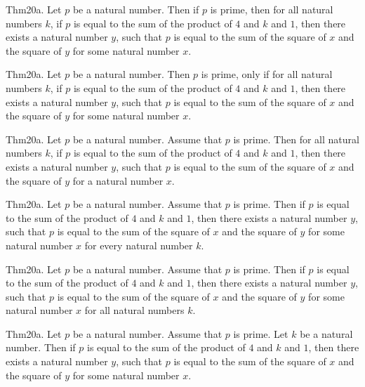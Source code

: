 \documentclass{article}
\begin{document}
Thm20a. Let $p$ be a natural number. Then if $p$ is prime, then for all natural numbers $k$, if $p$ is equal to the sum of the product of $4$ and $k$ and $1$, then there exists a natural number $y$, such that $p$ is equal to the sum of the square of $x$ and the square of $y$ for some natural number $x$.

Thm20a. Let $p$ be a natural number. Then $p$ is prime, only if for all natural numbers $k$, if $p$ is equal to the sum of the product of $4$ and $k$ and $1$, then there exists a natural number $y$, such that $p$ is equal to the sum of the square of $x$ and the square of $y$ for some natural number $x$.

Thm20a. Let $p$ be a natural number. Assume that $p$ is prime. Then for all natural numbers $k$, if $p$ is equal to the sum of the product of $4$ and $k$ and $1$, then there exists a natural number $y$, such that $p$ is equal to the sum of the square of $x$ and the square of $y$ for a natural number $x$.

Thm20a. Let $p$ be a natural number. Assume that $p$ is prime. Then if $p$ is equal to the sum of the product of $4$ and $k$ and $1$, then there exists a natural number $y$, such that $p$ is equal to the sum of the square of $x$ and the square of $y$ for some natural number $x$ for every natural number $k$.

Thm20a. Let $p$ be a natural number. Assume that $p$ is prime. Then if $p$ is equal to the sum of the product of $4$ and $k$ and $1$, then there exists a natural number $y$, such that $p$ is equal to the sum of the square of $x$ and the square of $y$ for some natural number $x$ for all natural numbers $k$.

Thm20a. Let $p$ be a natural number. Assume that $p$ is prime. Let $k$ be a natural number. Then if $p$ is equal to the sum of the product of $4$ and $k$ and $1$, then there exists a natural number $y$, such that $p$ is equal to the sum of the square of $x$ and the square of $y$ for some natural number $x$.
\end{document}
